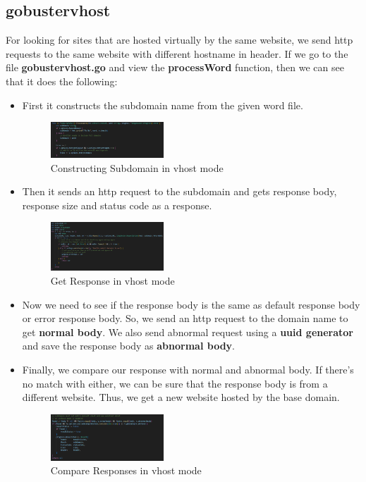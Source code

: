 \documentclass[12 pt]{article}
\begin{document}
\subsection{gobustervhost}
For looking for sites that are hosted virtually by the same website, we send http requests to the same website with different hostname in header. If we go to the file \textbf{gobustervhost.go} and view the \textbf{processWord} function, then we can see that it does the following:
\begin{itemize}
    \item First it constructs the subdomain name from the given word file.
    \begin{figure}[H]
        \centering
        \includegraphics[width=0.4\textwidth]{Gobustervhost_Construct_Subdomain.png}
        \caption{Constructing Subdomain in vhost mode}
        \label{fig: Gobustervhost Constructing Subdomain}
    \end{figure}
    \item Then it sends an http request to the subdomain and gets response body, response size and status code as a response.
    \begin{figure}[H]
        \centering
        \includegraphics[width=0.4\textwidth]{Gobustervhost_Get_Response.png}
        \caption{Get Response in vhost mode}
        \label{fig: Gobustervhost Get Response}
    \end{figure}
    \item Now we need to see if the response body is the same as default response body or error response body. So, we send an http request to the domain name to get \textbf{normal body}. We also send abnormal request using a \textbf{uuid generator} and save the response body as \textbf{abnormal body}.
    \item Finally, we compare our response with normal and abnormal body. If there’s no match with either, we can be sure that the response body is from a different website. Thus, we get a new website hosted by the base domain.
    \begin{figure}[H]
        \centering
        \includegraphics[width=0.4\textwidth]{Gobustervhost_Compare_Response.png}
        \caption{Compare Responses in vhost mode}
        \label{fig: Gobustervhost Compare Response}
    \end{figure}
\end{itemize}
\end{document}
